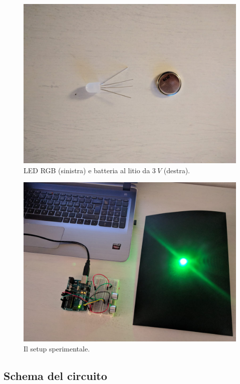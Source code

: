 \documentclass[11pt]{article}
\makeatletter
\def\maxwidth{\ifdim\Gin@nat@width>\linewidth\linewidth
    \else\Gin@nat@width\fi}
\let\Oldincludegraphics\includegraphics
\renewcommand{\includegraphics}[1]{\Oldincludegraphics[width=.8\maxwidth]{#1}}
\makeatother
\begin{document}
\begin{figure}[H]
  \centering
  \includegraphics{img/led.jpeg}
  \caption{LED RGB (sinistra) e batteria al litio da $3\:V$ (destra).\label{fig:led}}
\end{figure}

\begin{figure}[H]
  \centering
  \includegraphics{img/setup.jpeg}
  \caption{Il setup sperimentale.\label{fig:setup}}
\end{figure}

\hypertarget{schema-del-circuito}{%
\subsection{Schema del circuito}\label{schema-del-circuito}}
\end{document}
